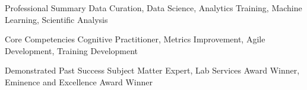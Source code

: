 

\begin{cvskills}

  \cvskill
    {Professional Summary} %
    {Data Curation, Data Science, Analytics Training, Machine Learning, Scientific Analysis} %

  \cvskill
    {Core Competencies} %
    {Cognitive Practitioner, Metrics Improvement, Agile Development, Training Development} %

  \cvskill
    {Demonstrated Past Success} %
    {Subject Matter Expert, Lab Services Award Winner, Eminence and Excellence Award Winner} %

\end{cvskills}
